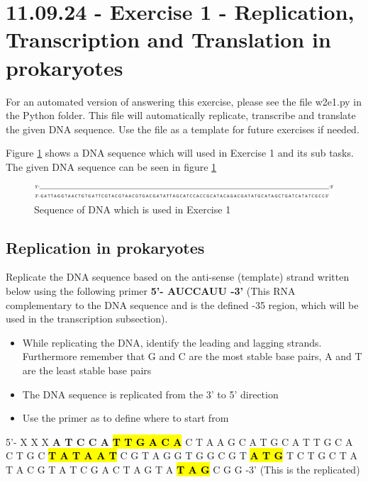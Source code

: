 \section{11.09.24 - Exercise 1 - Replication, Transcription and Translation in prokaryotes}
For an automated version of answering this exercise, please see the file w2e1.py in the Python folder. This file will automatically replicate, transcribe and translate the given DNA sequence. Use the file as a template for future exercises if needed.

Figure \ref*{fig:Exercise1Seq} shows a DNA sequence which will used in Exercise 1 and its sub tasks. The given DNA sequence can be seen in figure \ref{fig:Exercise1Seq}

\begin{figure}[h]
    \centering  
    \includegraphics[width=1\textwidth]{Figures/Exercise1Seq.png}
    \caption{Sequence of DNA which is used in Exercise 1}
    \label{fig:Exercise1Seq}
\end{figure}
\subsection{Replication in prokaryotes}
Replicate the DNA sequence based on the anti-sense (template) strand written below using the following primer \textbf{5’- AUCCAUU -3’} (This RNA complementary to the DNA sequence and is the defined -35 region, which will be used in the transcription subsection).

\vspace{1em}
\begin{itemize}
    \item While replicating the DNA, identify the leading and lagging strands. Furthermore remember that G and C are the most stable base pairs, A and T are the least stable base pairs
    \item The DNA sequence is replicated from the 3’ to 5’ direction
    \item Use the primer as to define where to start from
\end{itemize} 

\vspace{1em}

5'- X X X \textbf{A T C C A} \textbf{\hl{T T G A C A}} C T A A G C A T G C A T T G C A C T G C \hl{\textbf{T A T A A T}} C G T A G G T G G C G T \textbf{\hl{A T G}} T C T G C T A T A C G T A T C G A C T A G T A \textbf{\hl{T A G}} C G G -3'      (This is the replicated)

